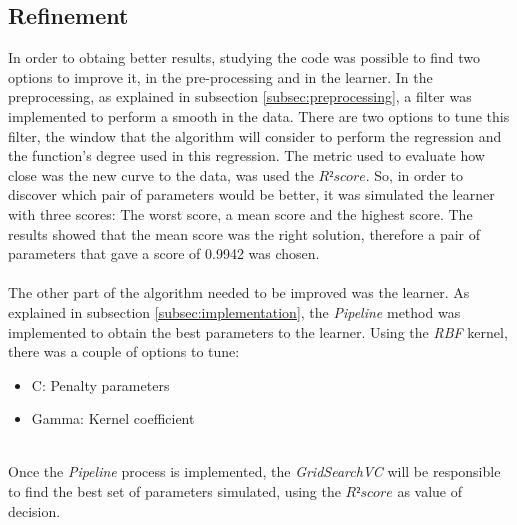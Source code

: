 \subsection{Refinement}
\label{subsec:refinement}
In order to obtaing better results, studying the code was possible to find two options to improve it, in the pre-processing and in the learner. In the preprocessing, as explained in subsection \ref{subsec:preprocessing},
a filter was implemented to perform a smooth in the data. There are two options to tune this filter, the window that the algorithm will consider to perform the regression and the function's degree used in this 
regression. The metric used to evaluate how close was the new curve to the data, was used the $R² score$. So, in order to discover which pair of parameters would be better, it was simulated the learner with three
scores: The worst score, a mean score and the highest score. The results showed that the mean score was the right solution, therefore a pair of parameters that gave a score of 0.9942 was chosen.\\
\\
The other part of the algorithm needed to be improved was the learner. As explained in subsection \ref{subsec:implementation}, the \textit{Pipeline} method was implemented to obtain the best parameters
to the learner. Using the \textit{RBF} kernel, there was a couple of options to tune:
\begin{itemize}
 \item C: Penalty parameters\\
 \item Gamma: Kernel coefficient\\
\end{itemize}
\ \\
Once the \textit{Pipeline} process is implemented, the \textit{GridSearchVC} will be responsible to find the best set of parameters simulated, using the $R² score$ as value of decision.\\

